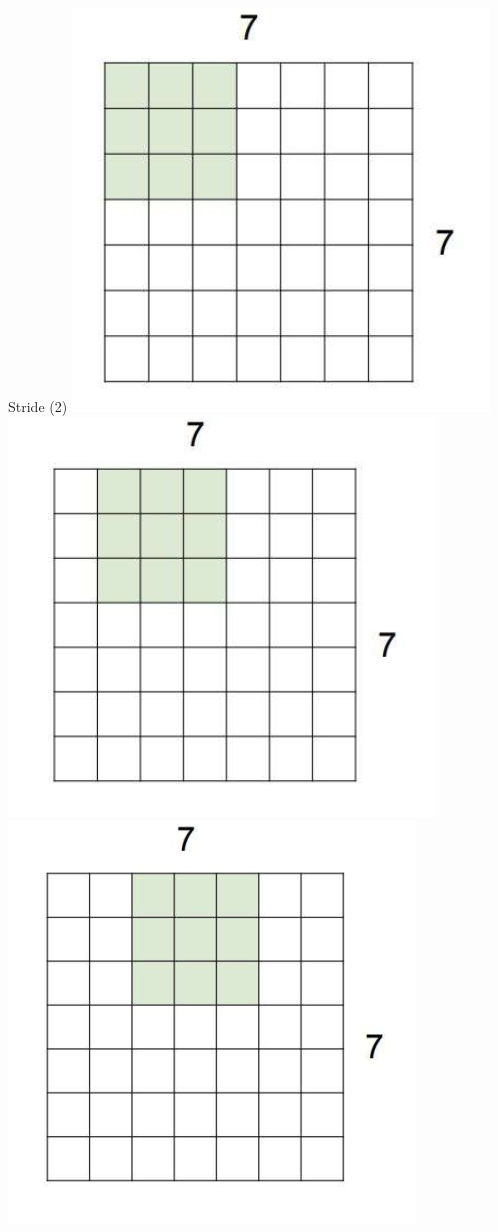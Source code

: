 \documentclass[serif, aspectratio=169]{beamer}
\begin{document}
	\begin{frame}{Stride (2)}
		\includegraphics[keepaspectratio, scale=0.5]{pic/stride11.png}
		\includegraphics[keepaspectratio, scale=0.5]{pic/stride12.png}
		\includegraphics[keepaspectratio, scale=0.5]{pic/stride13.png}
		

\end{frame}
\end{document}
